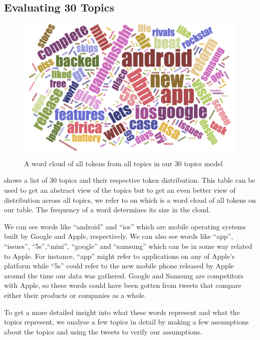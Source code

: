 \subsection{Evaluating 30 Topics}
\label{sec:evaluating-30-topics}
\begin{figure}
\begin{center}
  \includegraphics[scale=0.75,angle=90]{Figures/30_topics_cloud}
\end{center}
\caption{A word cloud of all tokens from all topics in our 30 topics model}
\label{fig:30-topics-cloud}
\end{figure}

 shows a list of 30 topics and their respective token distribution. This
table can be used to get an abstract view of the topics but to get an even better view of
distribution across all topics, we refer to  on
 which is a word cloud of all tokens on our table. The frequency of a
word determines its size in the cloud.

We can see words like ``android'' and ``ios'' which are mobile operating systems built by Google and
Apple, respectively. We can also see words like ``app'', ``issues'', ``5s'',``mini'', ``google'' and
``samsung'' which can be in some way related to Apple. For instance, ``app'' might refer to
applications on any of Apple's platform while ``5s'' could refer to the new mobile phone released by
Apple around the time our data was gathered. Google and Samsung are competitors with Apple, so these
words could have been gotten from tweets that compare either their products or companies as a
whole.

To get a more detailed insight into what these words represent and what the topics represent, we
analyse a few topics in detail by making a few assumptions about the topics and using the tweets to
verify our assumptions.\\


